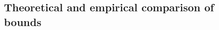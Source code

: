 \documentclass{article}
\theoremstyle{definition}
\newtheorem{theorem}{Theorem}[section]
\newcommand{\LF}[1]{\textcolor{blue}{\{LF: #1\}}}
\begin{document}
%
%
%
%
%
%	
%	
%


\subsection{Theoretical and empirical comparison of bounds}
\end{document}
